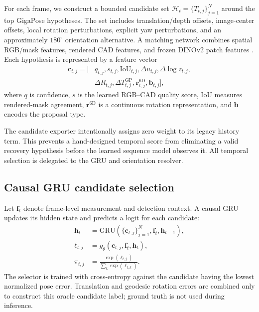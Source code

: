 \documentclass[10pt,twocolumn]{article}
\begin{document}
For each frame, we construct a bounded candidate set
$\mathcal{H}_t=\{T_{t,j}\}_{j=1}^{N}$ around the top GigaPose hypotheses. The
set includes translation/depth offsets, image-center offsets, local rotation
perturbations, explicit yaw perturbations, and an approximately $180^\circ$
orientation alternative. A matching network combines spatial RGB/mask
features, rendered CAD features, and frozen DINOv2 patch features
\cite{oquab2023dinov2}. Each hypothesis is represented by a feature vector
\begin{equation}
\begin{aligned}
\bm{c}_{t,j} = [&q_{t,j},s_{t,j},\mathrm{IoU}_{t,j},
\Delta u_{t,j},\Delta\log z_{t,j},\\
&\Delta R_{t,j},\Delta T^{\mathrm{GP}}_{t,j},
\bm{r}^{6\mathrm{D}}_{t,j},\bm{b}_{t,j}],
\end{aligned}
\end{equation}
where $q$ is confidence, $s$ is the learned RGB--CAD quality score,
$\mathrm{IoU}$ measures rendered-mask agreement, $\bm{r}^{6\mathrm{D}}$ is a
continuous rotation representation, and $\bm{b}$ encodes the proposal type.

The candidate exporter intentionally assigns zero weight to its legacy
history term. This prevents a hand-designed temporal score from eliminating a
valid recovery hypothesis before the learned sequence model observes it. All
temporal selection is delegated to the GRU and orientation resolver.

\subsection{Causal GRU candidate selection}

Let $\bm{f}_t$ denote frame-level measurement and detection context. A causal
GRU updates its hidden state and predicts a logit for each candidate:
\begin{align}
\bm{h}_t &= \mathrm{GRU}(\{\bm{c}_{t,j}\}_{j=1}^{N},\bm{f}_t,\bm{h}_{t-1}),\\
\ell_{t,j} &= g_{\theta}(\bm{c}_{t,j},\bm{f}_t,\bm{h}_t),\\
\pi_{t,j} &= \frac{\exp(\ell_{t,j})}{\sum_k\exp(\ell_{t,k})}.
\end{align}
The selector is trained with cross-entropy against the candidate having the
lowest normalized pose error. Translation and geodesic rotation errors are
combined only to construct this oracle candidate label; ground truth is not
used during inference.
\end{document}
